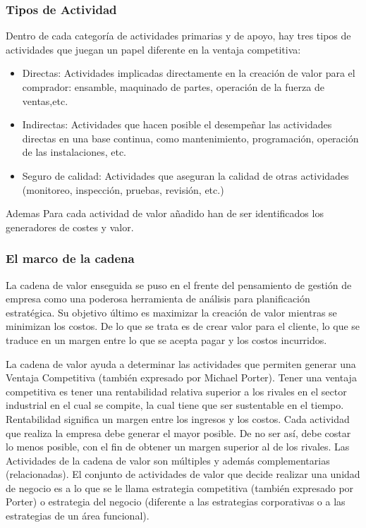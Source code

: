 \subsubsection*{Tipos de Actividad}
Dentro de cada categoría de actividades primarias y de apoyo, hay tres tipos de actividades que juegan un papel diferente en la ventaja competitiva:
\begin{itemize}
	\item Directas: Actividades implicadas directamente en la creación de valor para el comprador: ensamble, maquinado de partes, operación de la fuerza de ventas,etc.
	\item Indirectas: Actividades que hacen posible el desempeñar las actividades directas en una base continua, como mantenimiento, programación, operación de las instalaciones, etc.
	\item Seguro de calidad: Actividades que aseguran la calidad de otras actividades (monitoreo, inspección, pruebas, revisión, etc.)
\end{itemize}
Ademas Para cada actividad de valor añadido han de ser identificados los generadores de costes y valor.

\subsubsection*{El marco de la cadena}

La cadena de valor enseguida se puso en el frente del pensamiento de gestión de empresa como una poderosa
herramienta de análisis para planificación estratégica. Su objetivo último es maximizar la creación de valor
mientras se minimizan los costos. De lo que se trata es de crear valor para el cliente, lo que se traduce
en un margen entre lo que se acepta pagar y los costos incurridos.

La cadena de valor ayuda a determinar las actividades que permiten generar una Ventaja Competitiva (también
expresado por Michael Porter). Tener una ventaja competitiva es tener una rentabilidad relativa superior a
los rivales en el sector industrial en el cual se compite, la cual tiene que ser sustentable en el tiempo.
Rentabilidad significa un margen entre los ingresos y los costos. Cada actividad que realiza la empresa debe
generar el mayor posible. De no ser así, debe costar lo menos posible, con el fin de obtener un margen superior
al de los rivales. Las Actividades de la cadena de valor son múltiples y además complementarias (relacionadas).
El conjunto de actividades de valor que decide realizar una unidad de negocio es a lo que se le llama estrategia
competitiva (también expresado por Porter) o estrategia del negocio (diferente a las estrategias corporativas
o a las estrategias de un área funcional).

